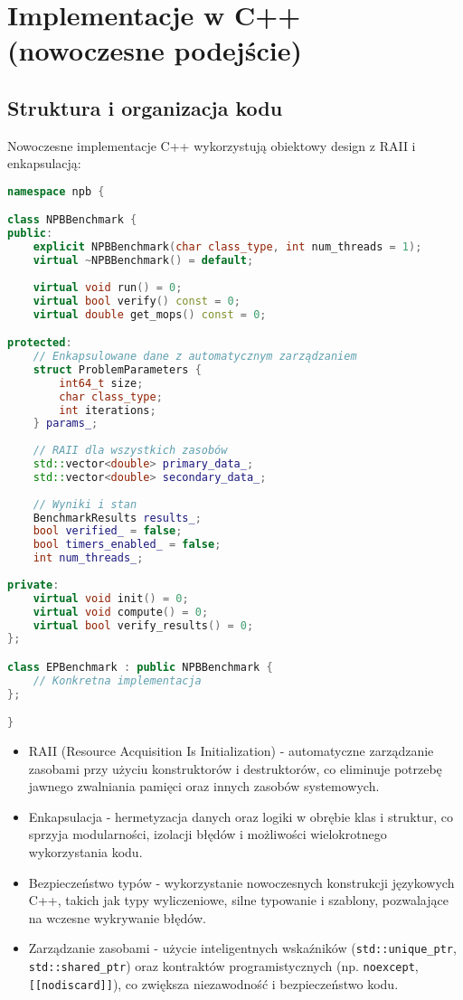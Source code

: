 \section{Implementacje w C++ (nowoczesne podejście)}
\subsection{Struktura i organizacja kodu}
Nowoczesne implementacje C++ wykorzystują obiektowy design z RAII i enkapsulacją:
\begin{lstlisting}[language=C++, caption={Implementacja nowoczesnego C++ - struktura kodu}, label={lst:modern-cpp-structure}]
namespace npb {

class NPBBenchmark {
public:
    explicit NPBBenchmark(char class_type, int num_threads = 1);
    virtual ~NPBBenchmark() = default;
    
    virtual void run() = 0;
    virtual bool verify() const = 0;
    virtual double get_mops() const = 0;

protected:
    // Enkapsulowane dane z automatycznym zarządzaniem
    struct ProblemParameters {
        int64_t size;
        char class_type;
        int iterations;
    } params_;
    
    // RAII dla wszystkich zasobów
    std::vector<double> primary_data_;
    std::vector<double> secondary_data_;
    
    // Wyniki i stan
    BenchmarkResults results_;
    bool verified_ = false;
    bool timers_enabled_ = false;
    int num_threads_;
    
private:
    virtual void init() = 0;
    virtual void compute() = 0;
    virtual bool verify_results() = 0;
};

class EPBenchmark : public NPBBenchmark {
    // Konkretna implementacja
};

}
\end{lstlisting}
\begin{itemize}
    \item RAII (Resource Acquisition Is Initialization) - automatyczne zarządzanie zasobami przy użyciu konstruktorów i destruktorów, co eliminuje potrzebę jawnego zwalniania pamięci oraz innych zasobów systemowych.
    
    \item Enkapsulacja - hermetyzacja danych oraz logiki w obrębie klas i struktur, co sprzyja modularności, izolacji błędów i możliwości wielokrotnego wykorzystania kodu.
    
    \item Bezpieczeństwo typów - wykorzystanie nowoczesnych konstrukcji językowych C++, takich jak typy wyliczeniowe, silne typowanie i szablony, pozwalające na wczesne wykrywanie błędów.
    
    \item Zarządzanie zasobami - użycie inteligentnych wskaźników (\texttt{std::unique\_ptr}, \texttt{std::shared\_ptr}) oraz kontraktów programistycznych (np. \texttt{noexcept}, \texttt{[[nodiscard]]}), co zwiększa niezawodność i bezpieczeństwo kodu.
\end{itemize}

